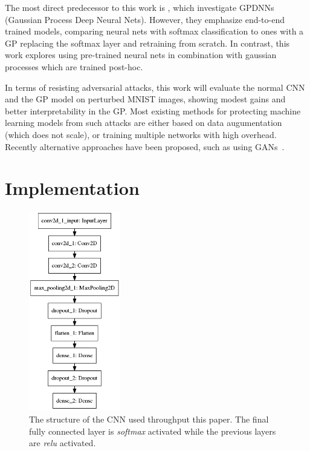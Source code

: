 \documentclass{article}
\begin{document}
The most direct predecessor to this work is \citet{Bradshaw2017}, which investigate GPDNNs (Gaussian Process Deep Neural Nets). However, they emphasize end-to-end trained models, comparing neural nets with softmax classification to ones with a GP replacing the softmax layer and retraining from scratch. In contrast, this work explores using pre-trained neural nets in combination with gaussian processes which are trained post-hoc. 

In terms of resisting adversarial attacks, this work will evaluate the normal CNN and the GP model on perturbed MNIST images, showing modest gains and better interpretability in the GP. Most existing methods for protecting machine learning models from such attacks are either based on data augumentation (which does not scale), or training multiple networks with high overhead. Recently alternative approaches have been proposed, such as using GANs~\cite{samangouei2018defense}\cite{zantedeschi2017efficient}.


 
\section{Implementation}

\begin{figure}[hbt]
\centering
\includegraphics[width=40mm,scale=0.5]{figures/mnist/CNN_model.png}
\caption{The structure of the CNN used throughput this paper. The final fully connected layer is \textit{softmax} activated while the previous layers are \textit{relu} activated.}
\end{figure}
\end{document}
